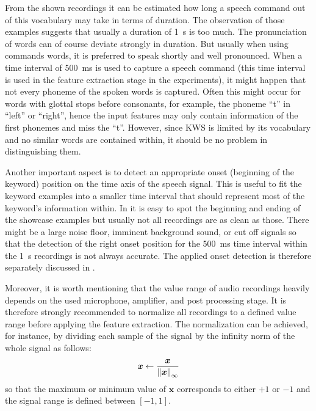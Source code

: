\FloatBarrier
\noindent
From the shown recordings it can be estimated how long a speech command out of this vocabulary may take in terms of duration.
The observation of those examples suggests that usually a duration of \SI{1}{\second} is too much.
The pronunciation of words can of course deviate strongly in duration.
But usually when using commands words, it is preferred to speak shortly and well pronounced.
When a time interval of \SI{500}{\milli\second} is used to capture a speech command (this time interval is used in the feature extraction stage in the experiments), it might happen that not every phoneme of the spoken words is captured.
Often this might occur for words with glottal stops before consonants, for example, the phoneme \enquote{t} in \enquote{left} or \enquote{right}, hence the input features may only contain information of the first phonemes and miss the \enquote{t}.
However, since KWS is limited by its vocabulary and no similar words are contained within, it should be no problem in distinguishing them.

Another important aspect is to detect an appropriate onset (beginning of the keyword) position on the time axis of the speech signal.
This is useful to fit the keyword examples into a smaller time interval that should represent most of the keyword's information within.
In  it is easy to spot the beginning and ending of the showcase examples but usually not all recordings are as clean as those.
There might be a large noise floor, imminent background sound, or cut off signals so that the detection of the right onset position for the \SI{500}{\milli\second} time interval within the \SI{1}{\second} recordings is not always accurate.
The applied onset detection is therefore separately discussed in .

Moreover, it is worth mentioning that the value range of audio recordings heavily depends on the used microphone, amplifier, and post processing stage.
It is therefore strongly recommended to normalize all recordings to a defined value range before applying the feature extraction.
The normalization can be achieved, for instance, by dividing each sample of the signal by the infinity norm of the whole signal as follows:
\begin{equation}
  \bm{x} \gets \frac{\bm{x}}{\norm{\bm{x}}_\infty}
\end{equation}
so that the maximum or minimum value of $\bm{x}$ corresponds to either $+1$ or $-1$ and the signal range is defined between $[-1, 1]$.
